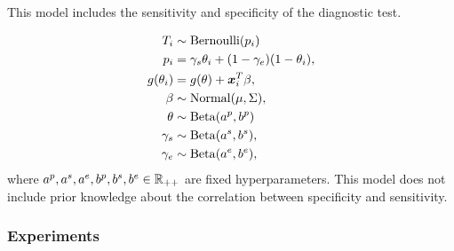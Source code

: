 This model includes the sensitivity and specificity of the diagnostic test. 

\begin{equation}
  \begin{aligned}
    T_i &\sim \operatorname{Bernoulli}(p_i) \\
    p_i &= \gamma_s\theta_i + (1-\gamma_e)(1 - \theta_i),  \\
    g(\theta_i) &= g(\theta) + \boldsymbol{x}_i^T\beta,  \\
    \beta &\sim \operatorname{Normal}(\mu, \Sigma), \\ 
    \theta &\sim \operatorname{Beta}(a^p, b^p) \\
    \gamma_s &\sim \operatorname{Beta}(a^s, b^s), \\
    \gamma_e &\sim \operatorname{Beta}(a^e, b^e), \\    
  \end{aligned}  
\end{equation}
where $a^p, a^s, a^e, b^p, b^s, b^e \in \mathbb{R}_{++}$ are fixed hyperparameters.
This model does not include prior knowledge about the correlation between
specificity and sensitivity. 

\subsubsection{Experiments}

